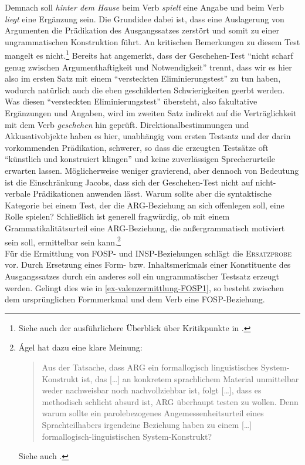 Demnach soll {\it hinter dem Hause} beim Verb {\it spielt} eine Angabe und beim Verb {\it liegt} eine Ergänzung sein. Die Grundidee dabei ist, dass eine Auslagerung von Argumenten die Prädikation des Ausgangssatzes zerstört und somit zu einer ungrammatischen Konstruktion führt. An kritischen Bemerkungen zu diesem Test mangelt es nicht.\footnote{Siehe auch der ausführlichere Überblick über Kritikpunkte in \citet[178f]{Agel:00}.} Bereits \cite{Jacobs:94} hat angemerkt, dass der Geschehen-Test "`nicht scharf genug zwischen Argumenthaftigkeit und Notwendigkeit"' \cite[Fußnote 16]{Jacobs:94} trennt, dass wir es hier also im ersten Satz mit einem "`versteckten Eliminierungstest"' \cite[178]{Agel:00} zu tun haben, wodurch natürlich auch die eben geschilderten Schwierigkeiten geerbt werden. Was diesen "`versteckten Eliminierungstest"' übersteht, also fakultative Ergänzungen und Angaben, wird im zweiten Satz indirekt auf die Verträglichkeit mit dem Verb {\it geschehen} hin geprüft. Direktionalbestimmungen und Akkusativobjekte haben es hier, unabhängig vom ersten Testsatz und der darin vorkommenden Prädikation, schwerer, so dass die erzeugten Testsätze oft "`künstlich und konstruiert klingen"' \cite[76]{Storrer:92} und keine zuverlässigen Sprecherurteile erwarten lassen. Möglicherweise weniger gravierend, aber dennoch von Bedeutung ist die Einschränkung Jacobs, dass sich der Geschehen-Test nicht auf nicht-verbale Prädikationen anwenden lässt. Warum sollte aber die syntaktische Kategorie bei einem Test, der die ARG-Beziehung an sich offenlegen soll, eine Rolle spielen? Schlie\ss lich ist generell fragwürdig, ob mit einem Grammatikalitätsurteil eine ARG-Beziehung, die au\ss ergrammatisch motiviert sein soll, ermittelbar sein kann.\footnote{\'Agel hat dazu eine klare Meinung: 
\begin{quote}
Aus der Tatsache, dass ARG ein formallogisch linguistisches System-Konstrukt ist, das [\ldots] an konkretem sprachlichem Material unmittelbar weder nachweisbar noch nachvollziehbar ist, folgt [\ldots], dass es methodisch schlicht absurd ist, ARG überhaupt testen zu wollen. Denn warum sollte ein parolebezogenes Angemessenheitsurteil eines Sprachteilhabers irgendeine Beziehung haben zu einem [\ldots] formal\-logisch-linguistischen System-Konstrukt? \citep[179]{Agel:00}
\end{quote} 
Siehe auch \citet[235]{Storrer:92}.}  \\




Für die Ermittlung von FOSP- und INSP-Beziehungen schlägt \citet[180]{Agel:00} die \textsc{Ersatzprobe} vor. Durch Ersetzung eines Form- bzw. Inhaltsmerkmals einer Konstituente des Ausgangssatzes durch ein anderes soll ein ungrammatischer Testsatz erzeugt werden. Gelingt dies wie in \ref{ex-valenzermittlung-FOSP1}, so besteht zwischen dem ursprünglichen Formmerkmal und dem Verb eine FOSP-Beziehung. 

